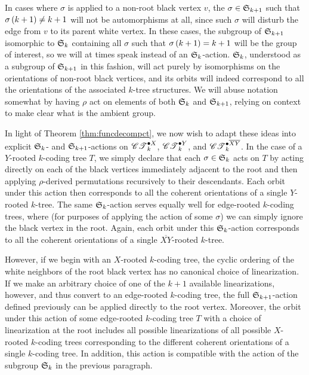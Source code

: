 \documentclass[sectionflow,singlespace,twoside,boldmathhdr,draft]{brandiss} %
\numberwithin{section}{chapter}
\numberwithin{figure}{chapter}
\begin{document}
In cases where $\sigma$ is applied to a non-root black vertex $v$, the $\sigma \in \symgp{k+1}$ such that $\sigma \pbrac{k+1} \neq k+1$ will not be automorphisms at all, since such $\sigma$ will disturb the edge from $v$ to its parent white vertex.
In these cases, the subgroup of $\symgp{k+1}$ isomorphic to $\symgp{k}$ containing all $\sigma$ such that $\sigma \pbrac{k+1} = k+1$ will be the group of interest, so we will at times speak instead of an $\symgp{k}$-action.
$\symgp{k}$, understood as a subgroup of $\symgp{k+1}$ in this fashion, will act purely by isomorphisms on the orientations of non-root black vertices, and its orbits will indeed correspond to all the orientations of the associated $k$-tree structures.
We will abuse notation somewhat by having $\rho$ act on elements of both $\symgp{k}$ and $\symgp{k+1}$, relying on context to make clear what is the ambient group.

In light of Theorem \ref{thm:funcdecompct}, we now wish to adapt these ideas into explicit $\symgp{k}$- and $\symgp{k+1}$-actions on $\pointed[X]{\specname{CT}}_{k}$, $\pointed[Y]{\specname{CT}}_{k}$, and $\pointed[\overline{XY}]{\specname{CT}}_{k}$.
In the case of a $Y$-rooted $k$-coding tree $T$, we simply declare that each $\sigma \in \symgp{k}$ acts on $T$ by acting directly on each of the black vertices immediately adjacent to the root and then applying $\rho$-derived permutations recursively to their descendants.
Each orbit under this action then corresponds to all the coherent orientations of a single $Y$-rooted $k$-tree.
The same $\symgp{k}$-action serves equally well for edge-rooted $k$-coding trees, where (for purposes of applying the action of some $\sigma$) we can simply ignore the black vertex in the root.
Again, each orbit under this $\symgp{k}$-action corresponds to all the coherent orientations of a single $\overline{XY}$-rooted $k$-tree.

However, if we begin with an $X$-rooted $k$-coding tree, the cyclic ordering of the white neighbors of the root black vertex has no canonical choice of linearization.
If we make an arbitrary choice of one of the $k+1$ available linearizations, however, and thus convert to an edge-rooted $k$-coding tree, the full $\symgp{k+1}$-action defined previously can be applied directly to the root vertex.
Moreover, the orbit under this action of some edge-rooted $k$-coding tree $T$ with a choice of linearization at the root includes all possible linearizations of all possible $X$-rooted $k$-coding trees corresponding to the different coherent orientations of a single $k$-coding tree.
In addition, this action is compatible with the action of the subgroup $\symgp{k}$ in the previous paragraph.
\end{document}

